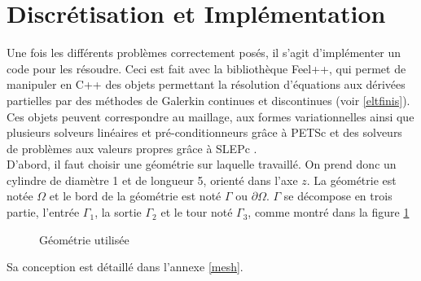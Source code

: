 \part{Discrétisation et Implémentation}
\label{partImp}

Une fois les différents problèmes correctement posés, il s'agit d'implémenter un code pour les résoudre. Ceci est fait avec la bibliothèque Feel++, qui permet de manipuler en C++ des objets permettant la résolution d'équations aux dérivées partielles par des méthodes de Galerkin continues et discontinues (voir \ref{eltfinis}). Ces objets peuvent correspondre au maillage, aux formes variationnelles ainsi que plusieurs solveurs linéaires et pré-conditionneurs grâce à PETSc \cite{petsc-web-page,petsc-user-ref,petsc-efficient} et des solveurs de problèmes aux valeurs propres grâce à SLEPc \cite{Hernandez:2005:SSF}.\\

D'abord, il faut choisir une géométrie sur laquelle travaillé. On prend donc un cylindre de diamètre 1 et de longueur 5, orienté dans l'axe $z$. La géométrie est notée $\Omega$ et le bord de la géométrie est noté $\Gamma$ ou $\partial\Omega$. $\Gamma$ se décompose en trois partie, l'entrée $\Gamma_1$,  la sortie $\Gamma_2$ et le tour noté $\Gamma_3$, comme montré dans la figure \ref{figMesh}\\

\begin{figure}[H]
\centering
{}
\caption{Géométrie utilisée}
\label{figMesh}
\end{figure}

Sa conception est détaillé dans l'annexe \ref{mesh}.

